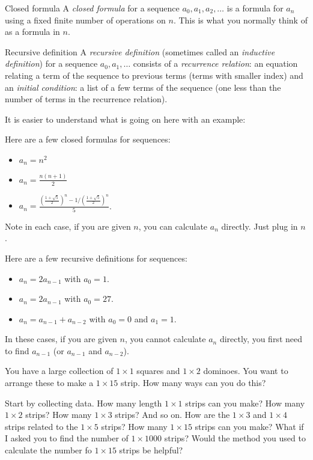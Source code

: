\documentclass[12pt]{article}
\begin{document}
\begin{defbox}{Closed formula}
 A {\em closed formula} for a sequence $a_0, a_1, a_2,\ldots$ is a formula for $a_n$ using a fixed finite number of operations on $n$.  This is what you normally think of as a formula in $n$.  
\end{defbox}

\begin{defbox}{Recursive definition}
 A {\em recursive definition} (sometimes called an {\em inductive definition}) for a sequence $a_0, a_1, \ldots$ consists of a {\em recurrence relation}: an equation relating a term of the sequence to previous terms (terms with smaller index) and an {\em initial condition}: a list of a few terms of the sequence (one less than the number of terms in the recurrence relation).
\end{defbox}

It is easier to understand what is going on here with an example:

\begin{example}
 Here are a few closed formulas for sequences:
 \begin{itemize}
  \item $a_n = n^2$
  \item $a_n = \frac{n(n+1)}{2}$
  \item $a_n = \frac{(\frac{1 + \sqrt 5}{2})^n - 1/(\frac{1 + \sqrt 5}{2})^n}{5}$.
 \end{itemize}
 Note in each case, if you are given $n$, you can calculate $a_n$ directly. Just plug in $n$.
 
 Here are a few recursive definitions for sequences:
 \begin{itemize}
  \item $a_n = 2a_{n-1}$ with $a_0 = 1$.
  \item $a_n = 2a_{n-1}$ with $a_0 = 27$.
  \item $a_n = a_{n-1} + a_{n-2}$ with $a_0 = 0$ and $a_1 = 1$.
 \end{itemize}
  In these cases, if you are given $n$, you cannot calculate $a_n$ directly, you first need to find $a_{n-1}$ (or $a_{n-1}$ and $a_{n-2}$).  
\end{example}


\begin{activity}
You have a large collection of $1\times 1$ squares and $1\times 2$ dominoes.  You want to arrange these to make a $1 \times 15$ strip.  How many ways can you do this?
\begin{questions}
  \question Start by collecting data.  How many length $1\times 1$ strips can you make?  How many $1\times 2$ strips?  How many $1\times 3$ strips?  And so on.
  \question How are the $1\times 3$ and $1 \times 4$ strips related to the $1\times 5$ strips?  
  \question How many $1\times 15$ strips can you make?
  \question What if I asked you to find the number of $1\times 1000$ strips?  Would the method you used to calculate the number fo  $1 \times 15$ strips be helpful?  

\end{questions}
\end{activity}
\end{document}
